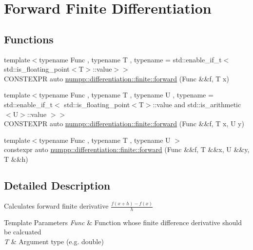 \hypertarget{group__numpp__differentiation__finite__forward}{}\section{Forward Finite Differentiation}
\label{group__numpp__differentiation__finite__forward}
\subsection*{Functions}
\begin{DoxyCompactItemize}
\item 
{\footnotesize template$<$typename Func , typename T , typename  = std\+::enable\+\_\+if\+\_\+t$<$std\+::is\+\_\+floating\+\_\+point$<$\+T$>$\+::value$>$$>$ }\\C\+O\+N\+S\+T\+E\+X\+PR auto \hyperlink{group__numpp__differentiation__finite__forward_gae6e65093878d82dc320ee7a66ccb1aab}{numpp\+::differentiation\+::finite\+::forward} (Func \&\&f, T x)
\item 
{\footnotesize template$<$typename Func , typename T , typename U , typename  = std\+::enable\+\_\+if\+\_\+t$<$      std\+::is\+\_\+floating\+\_\+point$<$\+T$>$\+::value and      std\+::is\+\_\+arithmetic$<$\+U$>$\+::value    $>$$>$ }\\C\+O\+N\+S\+T\+E\+X\+PR auto \hyperlink{group__numpp__differentiation__finite__forward_ga30e4e4b2bacc6da290b47bc94906b404}{numpp\+::differentiation\+::finite\+::forward} (Func \&\&f, T x, U y)
\item 
{\footnotesize template$<$typename Func , typename T , typename U $>$ }\\constexpr auto \hyperlink{group__numpp__differentiation__finite__forward_ga8388c3abacb4e48777bb284330f24490}{numpp\+::differentiation\+::finite\+::forward} (Func \&\&f, T \&\&x, U \&\&y, T \&\&h)
\end{DoxyCompactItemize}


\subsection{Detailed Description}
Calculates forward finite derivative $\frac{f(x+h)-f(x)}{h}$


\begin{DoxyTemplParams}{Template Parameters}
{\em Func} & Function whose finite difference derivative should be calcuated \\
\hline
{\em T} & Argument type (e.\+g. double)\\
\hline
\end{DoxyTemplParams}

